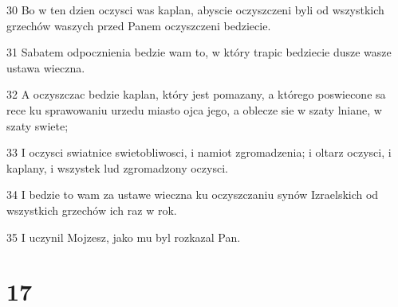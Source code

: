 \par 30 Bo w ten dzien oczysci was kaplan, abyscie oczyszczeni byli od wszystkich grzechów waszych przed Panem oczyszczeni bedziecie.
\par 31 Sabatem odpocznienia bedzie wam to, w który trapic bedziecie dusze wasze ustawa wieczna.
\par 32 A oczyszczac bedzie kaplan, który jest pomazany, a którego poswiecone sa rece ku sprawowaniu urzedu miasto ojca jego, a oblecze sie w szaty lniane, w szaty swiete;
\par 33 I oczysci swiatnice swietobliwosci, i namiot zgromadzenia; i oltarz oczysci, i kaplany, i wszystek lud zgromadzony oczysci.
\par 34 I bedzie to wam za ustawe wieczna ku oczyszczaniu synów Izraelskich od wszystkich grzechów ich raz w rok.
\par 35 I uczynil Mojzesz, jako mu byl rozkazal Pan.

\chapter{17}

